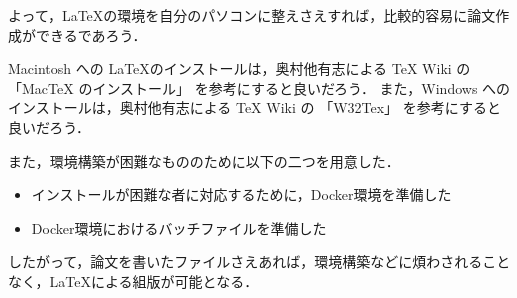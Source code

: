 よって，\LaTeX の環境を自分のパソコンに整えさえすれば，比較的容易に論文作成ができるであろう．

Macintosh への \LaTeX のインストールは，奥村他有志による TeX Wiki の 「MacTeX のインストール」\cite{mactex} を参考にすると良いだろう．
また，Windows へのインストールは，奥村他有志による TeX Wiki の 「W32Tex」\cite{w32tex} を参考にすると良いだろう．

また，環境構築が困難なもののために以下の二つを用意した．
\begin{itemize}
\item インストールが困難な者に対応するために，Docker環境を準備した
\item Docker環境におけるバッチファイルを準備した
\end{itemize}

したがって，論文を書いたファイルさえあれば，環境構築などに煩わされることなく，\LaTeX による組版が可能となる．%
%